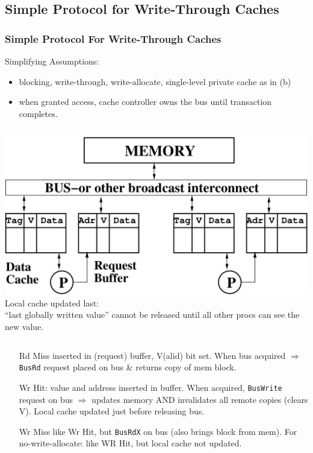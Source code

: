 \documentclass{beamer}
\newcommand{\emp}[1]{\textcolor{DikuRed}{ #1}}
\begin{document}
\subsection{Simple Protocol for Write-Through Caches}

\begin{frame}[fragile,t]
\frametitle{Simple Protocol For Write-Through Caches}

Simplifying Assumptions:
\begin{scriptsize}
\begin{itemize}
    \item blocking, write-through, write-allocate, single-level private cache as in (b) 
    \item when granted access, cache controller owns the bus until transaction completes.
\end  {itemize}
\end {scriptsize}
\smallskip

\begin{columns}
\includegraphics[width=35ex]{FigsInfCoherence/SMPreqbuff}
\pause
Local cache updated last:\\
\emp{``last globally written value''
cannot be released until all
other procs can see the new value}.
\end{columns} 

\smallskip
\begin{itemize}
    \item[Rd Miss] inserted in (request) buffer, V(alid) bit set.
    When bus acquired $\Rightarrow$ {\tt BusRd} request placed on bus \& returns copy of mem block.\pause

    \item[Wr Hit:] value and address inserted in buffer. When acquired, 
    {\tt BusWrite} request on bus $\Rightarrow$ updates memory AND \alert{invalidates all
    remote copies} (clears V). \emp{Local cache updated just before releasing bus.}

    \item[Wr Miss] like Wr Hit, but {\tt BusRdX} on bus (also brings block from mem).
    For no-write-allocate: like WR Hit, but local cache not updated.

\end  {itemize}

\end{frame}
\end{document}
